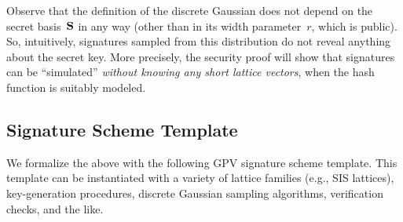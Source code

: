 \documentclass[11pt]{article}
\begin{document}
Observe that the definition of the discrete Gaussian does not depend
on the secret basis~$\mathbf{S}$ in any way (other than in its width
parameter~$r$, which is public). So, intuitively, signatures sampled
from this distribution do not reveal anything about the secret key.
More precisely, the security proof will show that signatures can be
``simulated'' \emph{without knowing any short lattice vectors}, when
the hash function is suitably modeled.

\subsection{Signature Scheme Template}
\label{sec:gpv-signature-scheme}

We formalize the above with the following GPV signature scheme
template. This template can be instantiated with a variety of lattice
families (e.g., SIS lattices), key-generation procedures, discrete
Gaussian sampling algorithms, verification checks, and the like.
\end{document}
